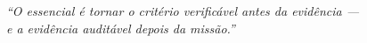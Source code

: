 \textit{``O essencial é tornar o critério verificável antes da evidência ---\\
e a evidência auditável depois da missão.''}
